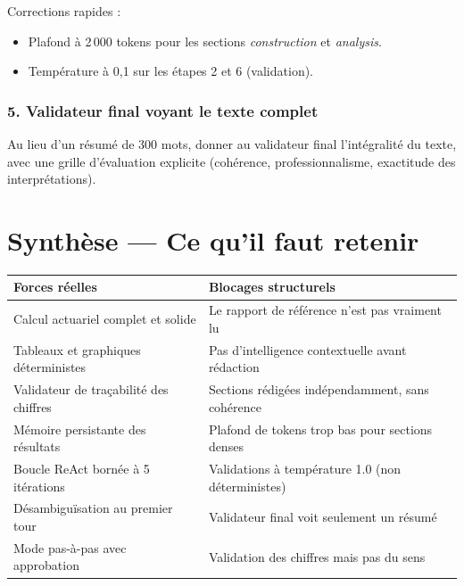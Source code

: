\documentclass[12pt,a4paper]{article}
\begin{document}
\begin{diagbox}
Corrections rapides :
\begin{itemize}[leftmargin=1.5em, itemsep=0pt]
  \item Plafond à 2\,000 tokens pour les sections \textit{construction} et \textit{analysis}.
  \item Température à 0,1 sur les étapes 2 et 6 (validation).
\end{itemize}

\subsubsection*{5. Validateur final voyant le texte complet}

Au lieu d'un résumé de 300 mots, donner au validateur final l'intégralité du
texte, avec une grille d'évaluation explicite (cohérence, professionnalisme,
exactitude des interprétations).

\end{diagbox}

\newpage

\section{Synthèse — Ce qu'il faut retenir}

\begin{center}
\begin{tabular}{p{7cm} p{7cm}}
\toprule
\textbf{\color{agentgreen} Forces réelles} & \textbf{\color{blockred} Blocages structurels} \\
\midrule
Calcul actuariel complet et solide
& Le rapport de référence n'est pas vraiment lu \\
\addlinespace
Tableaux et graphiques déterministes
& Pas d'intelligence contextuelle avant rédaction \\
\addlinespace
Validateur de traçabilité des chiffres
& Sections rédigées indépendamment, sans cohérence \\
\addlinespace
Mémoire persistante des résultats
& Plafond de tokens trop bas pour sections denses \\
\addlinespace
Boucle ReAct bornée à 5 itérations
& Validations à température 1.0 (non déterministes) \\
\addlinespace
Désambiguïsation au premier tour
& Validateur final voit seulement un résumé \\
\addlinespace
Mode pas-à-pas avec approbation
& Validation des chiffres mais pas du sens \\
\bottomrule
\end{tabular}
\end{center}
\end{document}
